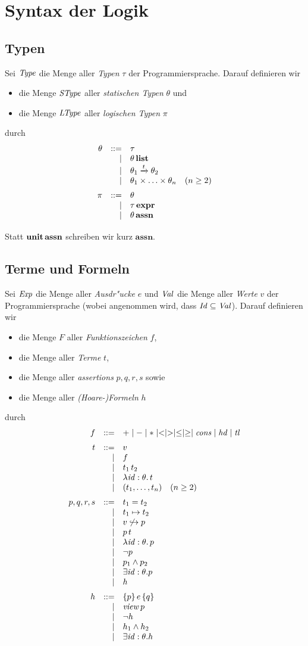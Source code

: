 \documentclass[12pt,a4paper,bigheadings]{scrartcl}
\newcommand{\assn}{\ensuremath{\mathbf{assn}}}
\newcommand{\atype}[1]{#1\,\assn}
\newcommand{\bexpr}{\ensuremath{\mathbf{expr}}}
\newcommand{\etype}[1]{#1\,\bexpr}
\newcommand{\Stype}{\name{SType}}
\newcommand{\tto}{\ensuremath{\xrightarrow{t}}}
\renewcommand{\disjoint}[2]{\ensuremath{#2\not\hookrightarrow#1}}
\newcommand{\view}[1]{\ensuremath{\app{\name{view}}{#1}}}
\begin{document}
\section{Syntax der Logik}

\subsection{Typen}

Sei ${\text{\it Type\/}}$ die Menge aller {\em Typen} $\tau$ der Programmiersprache. Darauf definieren wir 
\begin{itemize}
  \item die Menge $\Stype$ aller {\em statischen Typen} $\theta$ und
  \item die Menge ${\text{\it LType\/}}$ aller {\em logischen Typen} $\pi$
\end{itemize}
durch
\[\bgram
\theta  \is \tau
        \al \ltype{\theta}
        \al \theta_1 \tto \theta_2
        \al \theta_1 \times \ldots \times \theta_n \quad (n \ge 2)
        \n
\pi \is \theta
    \al \etype{\tau}
    \al \atype{\theta}
    \n
\egram\]
Statt $\atype{\unit}$ schreiben wir kurz $\assn$.

\subsection{Terme und Formeln}

Sei ${\text{\it Exp\/}}$ die Menge aller {\em Ausdr"ucke} $e$ und ${\text{\it Val\/}}$ die Menge aller {\em Werte} $v$
der Programmiersprache (wobei angenommen wird, dass ${\text{\it Id\/}} \subseteq {\text{\it Val\/}}$). Darauf definieren wir 
\begin{itemize}
  \item die Menge $F$ aller {\em Funktionszeichen} $f$,
  \item die Menge  aller {\em Terme} $t$,
  \item die Menge  aller {\em assertions} $p,q,r,s$ sowie
  \item die Menge  aller {\em (Hoare-)Formeln} $h$
\end{itemize}
durch
\[\bgram
f \is + \mid - \mid * \mid < \mid > \mid \le \mid \ge \mid \Cons \mid \Hd \mid \Tl
  \n
t \is v
  \al f
  \al \app{t_1}{t_2}
  \al \abstr{\id:\theta}{t}
  \al (t_1,\ldots,t_n)  \quad (n \ge 2)
  \n
p,q,r,s \is t_1 = t_2
        \al t_1 \mapsto t_2
        \al \disjoint{p}{v}
        \al \app{p}{t}
        \al \abstr{\id:\theta}{p}
        \al \neg p
        \al p_1 \wedge p_2
        \al \exists \id:\theta. p
        \al h
        \n
h \is \triple{p}{e}{q}
  \al \view{p}
  \al \neg h
  \al h_1 \wedge h_2
  \al \exists \id:\theta. h
\egram\]
\end{document}
